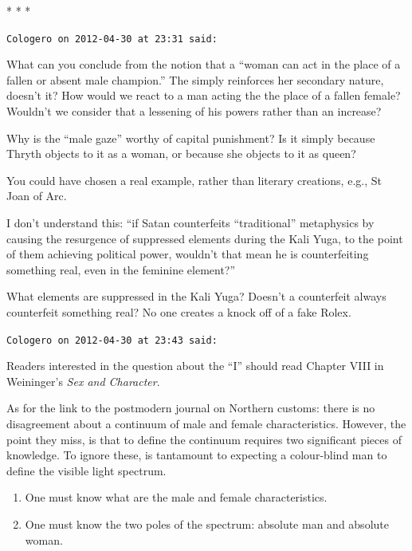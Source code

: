
\begin{center}* * *\end{center}

\begin{footnotesize}
\begin{sffamily}
\texttt{Cologero on 2012-04-30 at 23:31 said:}

What can you conclude from the notion that a ``woman can act in the place of a fallen or absent male champion.'' The simply reinforces her secondary nature, doesn't it? How would we react to a man acting the the place of a fallen female? Wouldn't we consider that a lessening of his powers rather than an increase?

Why is the ``male gaze'' worthy of capital punishment? Is it simply because Thryth objects to it as a woman, or because she objects to it as queen?

You could have chosen a real example, rather than literary creations, e.g., St Joan of Arc.

I don't understand this: ``if Satan counterfeits ``traditional'' metaphysics by causing the resurgence of suppressed elements during the Kali Yuga, to the point of them achieving political power, wouldn't that mean he is counterfeiting something real, even in the feminine element?''

What elements are suppressed in the Kali Yuga? Doesn't a counterfeit always counterfeit something real? No one creates a knock off of a fake Rolex.

\hfill

\texttt{Cologero on 2012-04-30 at 23:43 said:}

Readers interested in the question about the ``I'' should read Chapter VIII in Weininger's \textit{Sex and Character}.

As for the link to the postmodern journal on Northern customs: there is no disagreement about a continuum of male and female characteristics. However, the point they miss, is that to define the continuum requires two significant pieces of knowledge. To ignore these, is tantamount to expecting a colour-blind man to define the visible light spectrum.

\begin{enumerate}


\item One must know what are the male and female characteristics.

\item One must know the two poles of the spectrum: absolute man and absolute woman.
\end{enumerate}



\end{sffamily}
\end{footnotesize}
